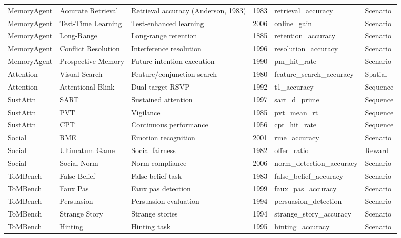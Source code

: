 \documentclass[10pt,landscape]{article}
\begin{document}
\begin{longtable}{@{}p{2.3cm}p{3.0cm}p{4.5cm}p{0.6cm}p{3.8cm}p{1.8cm}@{}}
\midrule
MemoryAgent & Accurate Retrieval & Retrieval accuracy (Anderson, 1983) & 1983 & retrieval\_accuracy & Scenario \\
MemoryAgent & Test-Time Learning & Test-enhanced learning & 2006 & online\_gain & Scenario \\
MemoryAgent & Long-Range & Long-range retention & 1885 & retention\_accuracy & Scenario \\
MemoryAgent & Conflict Resolution & Interference resolution & 1996 & resolution\_accuracy & Scenario \\
MemoryAgent & Prospective Memory & Future intention execution & 1990 & pm\_hit\_rate & Scenario \\

\midrule
Attention & Visual Search & Feature/conjunction search & 1980 & feature\_search\_accuracy & Spatial \\
Attention & Attentional Blink & Dual-target RSVP & 1992 & t1\_accuracy & Sequence \\

\midrule
SustAttn & SART & Sustained attention \citep{robertson1997sustained} & 1997 & sart\_d\_prime & Sequence \\
SustAttn & PVT & Vigilance & 1985 & pvt\_mean\_rt & Sequence \\
SustAttn & CPT & Continuous performance & 1956 & cpt\_hit\_rate & Sequence \\

\midrule
Social & RME & Emotion recognition \citep{baroncohen2001eyes} & 2001 & rme\_accuracy & Scenario \\
Social & Ultimatum Game & Social fairness \citep{guth1982experimental} & 1982 & offer\_ratio & Reward \\
Social & Social Norm & Norm compliance & 2006 & norm\_detection\_accuracy & Scenario \\

\midrule
ToMBench & False Belief & False belief task \citep{baroncohen1985mindblindness} & 1983 & false\_belief\_accuracy & Scenario \\
ToMBench & Faux Pas & Faux pas detection \citep{stone1998faux} & 1999 & faux\_pas\_accuracy & Scenario \\
ToMBench & Persuasion & Persuasion evaluation & 1994 & persuasion\_detection & Scenario \\
ToMBench & Strange Story & Strange stories \citep{happe1994advanced} & 1994 & strange\_story\_accuracy & Scenario \\
ToMBench & Hinting & Hinting task \citep{corcoran1995schizophrenia} & 1995 & hinting\_accuracy & Scenario \\


\end{longtable}
\end{document}
